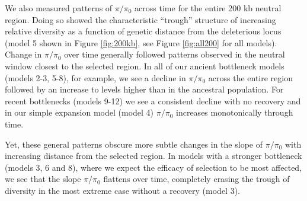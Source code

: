 \documentclass[9pt,twocolumn,twoside]{rilabRxiv}
\begin{document}
We also measured patterns of $\pi/\pi_0$ across time for the entire 200 kb neutral region.
Doing so showed the characteristic ``trough'' structure of increasing relative diversity as a function of genetic distance from the deleterious locus (model 5 shown in Figure \ref{fig:200kb}, see Figure \ref{fig:all200} for all models). Change in $\pi/\pi_0$ over time generally followed patterns observed in the neutral window closest to the selected region. In all of our ancient bottleneck models (models 2-3, 5-8), for example, we see a decline in $\pi/\pi_0$ across the entire region followed by an increase to levels higher than in the ancestral population. For recent bottlenecks (models 9-12) we see a consistent decline with no recovery and in our simple expansion model (model 4) $\pi/\pi_0$ increases monotonically through time.

Yet, these general patterns obscure more subtle changes in the slope of $\pi/\pi_0$ with increasing distance from the selected region. In models with a stronger bottleneck (models 3, 6 and 8), where we expect the efficacy of selection to be most affected, we see that the slope $\pi/\pi_0$ flattens over time, completely erasing the trough of diversity in the most extreme case without a recovery (model 3). 
\end{document}
